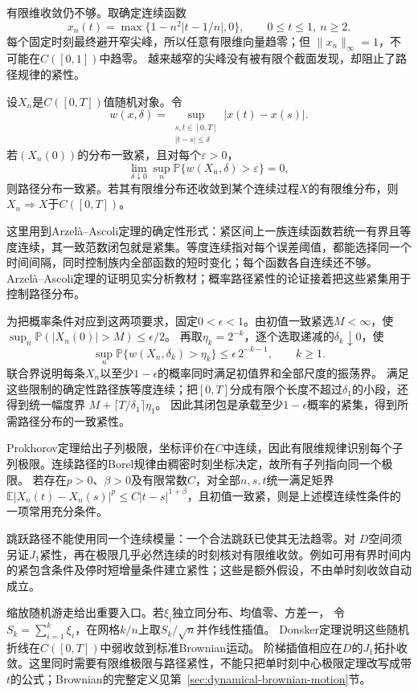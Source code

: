 有限维收敛仍不够。取确定连续函数
\[
x_n(t)=\max\{1-n^2|t-1/n|,0\},\qquad 0\leq t\leq1,\ n\geq2.
\]
每个固定时刻最终避开窄尖峰，所以任意有限维向量趋零；但
\(\|x_n\|_\infty=1\)，不可能在\(C([0,1])\)中趋零。
越来越窄的尖峰没有被有限个截面发现，却阻止了路径规律的紧性。

\begin{theorem}[连续路径的紧性与极限识别]
\label{thm:rv-continuous-path-tightness}
设\(X_n\)是\(C([0,T])\)值随机对象。令
\[
w(x,\delta)=\sup_{\substack{s,t\in[0,T]\\|t-s|\leq\delta}}|x(t)-x(s)|.
\]
若\((X_n(0))\)的分布一致紧，且对每个\(\varepsilon>0\)，
\[
\lim_{\delta\downarrow0}\sup_n
\mathbb P\{w(X_n,\delta)>\varepsilon\}=0,
\]
则路径分布一致紧。若其有限维分布还收敛到某个连续过程\(X\)的有限维分布，则
\(X_n\Rightarrow X\)于\(C([0,T])\)。
\end{theorem}
这里用到Arzelà--Ascoli定理的确定性形式：紧区间上一族连续函数若统一有界且等度连续，其一致范数闭包就是紧集。等度连续指对每个误差阈值，都能选择同一个时间间隔，同时控制族内全部函数的短时变化；每个函数各自连续还不够。Arzelà--Ascoli定理的证明见实分析教材；概率路径紧性的论证接着把这些紧集用于控制路径分布。

为把概率条件对应到这两项要求，固定\(0<\epsilon<1\)。由初值一致紧选\(M<\infty\)，使
\(\sup_n\mathbb P(|X_n(0)|>M)\leq\epsilon/2\)。
再取\(\eta_k=2^{-k}\)，逐个选取递减的\(\delta_k\downarrow0\)，使
\[
 \sup_n\mathbb P\{w(X_n,\delta_k)>\eta_k\}
 \leq\epsilon\,2^{-k-1},\qquad k\geq1.
\]
联合界说明每条\(X_n\)以至少\(1-\epsilon\)的概率同时满足初值界和全部尺度的振荡界。
满足这些限制的确定性路径族等度连续；把\([0,T]\)分成有限个长度不超过\(\delta_1\)的小段，还得到统一幅度界
\(M+\lceil T/\delta_1\rceil\eta_1\)。
因此其闭包是承载至少\(1-\epsilon\)概率的紧集，得到所需路径分布的一致紧性。

Prokhorov定理给出子列极限，坐标评价在\(C\)中连续，因此有限维规律识别每个子列极限。连续路径的Borel规律由稠密时刻坐标决定，故所有子列指向同一个极限。
若存在\(p>0\)、\(\beta>0\)及有限常数\(C\)，对全部\(n,s,t\)统一满足矩界
\(\mathbb E|X_n(t)-X_n(s)|^p\leq C|t-s|^{1+\beta}\)，且初值一致紧，则是上述模连续性条件的一项常用充分条件。

跳跃路径不能使用同一个连续模量：一个合法跳跃已使其无法趋零。对
\(D\)空间须另证\(J_1\)紧性，再在极限几乎必然连续的时刻核对有限维收敛。例如可用有界时间内的紧包含条件及停时短增量条件建立紧性；这些是额外假设，不由单时刻收敛自动成立。

缩放随机游走给出重要入口。若\(\xi_i\)独立同分布、均值零、方差一，
令\(S_k=\sum_{i=1}^k\xi_i\)，在网格\(k/n\)上取\(S_k/\sqrt n\)并作线性插值。
Donsker定理说明这些随机折线在\(C([0,T])\)中弱收敛到标准Brownian运动。
阶梯插值相应在\(D\)的\(J_1\)拓扑收敛。这里同时需要有限维极限与路径紧性，不能只把单时刻中心极限定理改写成带\(t\)的公式；Brownian的完整定义见第~\ref{sec:dynamical-brownian-motion}节。

